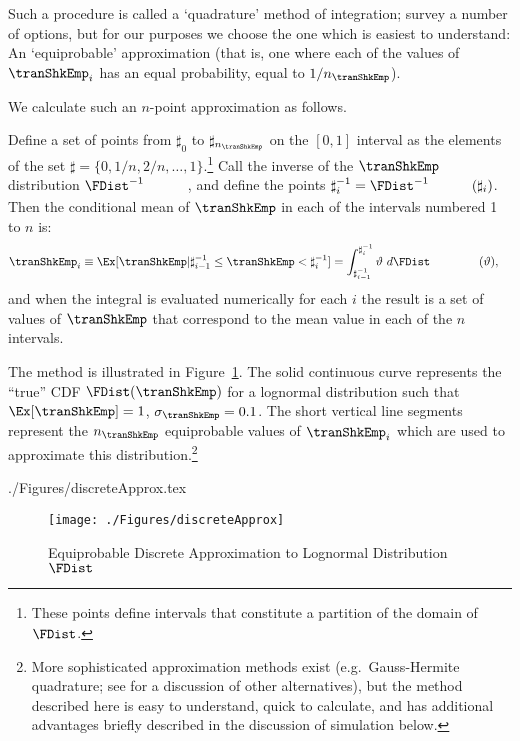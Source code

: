 \documentclass[SolvingMicroDSOPs]{subfiles}
\begin{document}
Such a procedure is called a `quadrature' method of integration; \cite{Tanaka2013-bc} survey a number of options, but for our purposes we choose the one which is easiest to understand: An `equiprobable' approximation (that is, one where each of the values of $\tranShkEmp_{i}$ has an equal probability, equal to $1/n_{\tranShkEmp}$).

We calculate such an $n$-point approximation as follows.

Define a set of points from $\sharp_{0}$ to $\sharp_{n_{\tranShkEmp}}$ on the $[0,1]$ interval
as the elements of the set $\sharp = \{0,1/n,2/n, \ldots,1\}$.\footnote{These points define intervals that constitute a partition of the domain of $\FDist$.}  Call the inverse of the $\tranShkEmp$ distribution $\FDist^{-1}_{\phantom{\tranShkEmp}}$, and define the
points $\sharp^{-1}_{i} = \FDist^{-1}_{\phantom{\tranShkEmp}}(\sharp_{i})$.  Then
the conditional mean of $\tranShkEmp$ in each of the intervals numbered 1 to $n$ is:
\begin{equation}\begin{gathered}\begin{aligned}
      \tranShkEmp_{i} \equiv \Ex[\tranShkEmp | \sharp_{i-1}^{-1} \leq \tranShkEmp < \sharp_{i}^{-1}]  & = \int_{\sharp^{-1}_{i-1}}^{\sharp^{-1}_{i}} \vartheta ~ d\FDist_{\phantom{\tranShkEmp}}(\vartheta)  ,
    \end{aligned}\end{gathered}\end{equation}
and when the integral is evaluated numerically for each $i$ the result is a set of values of $\tranShkEmp$ that correspond to the mean value in each of the $n$ intervals.

The method is illustrated in Figure~\ref{fig:discreteapprox}.  The solid continuous curve represents
the ``true'' CDF $\FDist(\tranShkEmp)$ for a lognormal distribution such that $\Ex[\tranShkEmp] = 1$, $\sigma_{\tranShkEmp} = 0.1$.  The short vertical line segments represent the $n_{\tranShkEmp}$
equiprobable values of $\tranShkEmp_{i}$ which are used to approximate this
distribution.\footnote{More sophisticated approximation methods exist
  (e.g.\ Gauss-Hermite quadrature; see \cite{kopecky2010finite} for a discussion of other alternatives), but the method described here is easy to understand, quick to calculate, and has additional advantages briefly described in the discussion of simulation below.}
\begin{verbatimwrite}{./Figures/discreteApprox.tex}
  \hypertarget{discreteApprox}{}
  \begin{figure}
    \texttt{[image: ./Figures/discreteApprox]}
    \caption{Equiprobable Discrete Approximation to Lognormal Distribution $\FDist$}
    \label{fig:discreteapprox}
  \end{figure}
\end{verbatimwrite}
\unskip
\end{document}
